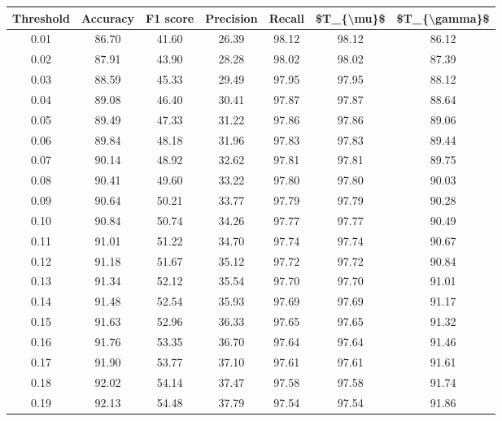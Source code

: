 \begin{tabular}{|c|c|c|c|c|c|c|}
\hline
 Threshold &  Accuracy &  F1 score &  Precision &  Recall &  \$T\_\{\textbackslash mu\}\$ &  \$T\_\{\textbackslash gamma\}\$ \\
\hline
      0.01 &     86.70 &     41.60 &      26.39 &   98.12 &      98.12 &         86.12 \\
      0.02 &     87.91 &     43.90 &      28.28 &   98.02 &      98.02 &         87.39 \\
      0.03 &     88.59 &     45.33 &      29.49 &   97.95 &      97.95 &         88.12 \\
      0.04 &     89.08 &     46.40 &      30.41 &   97.87 &      97.87 &         88.64 \\
      0.05 &     89.49 &     47.33 &      31.22 &   97.86 &      97.86 &         89.06 \\
      0.06 &     89.84 &     48.18 &      31.96 &   97.83 &      97.83 &         89.44 \\
      0.07 &     90.14 &     48.92 &      32.62 &   97.81 &      97.81 &         89.75 \\
      0.08 &     90.41 &     49.60 &      33.22 &   97.80 &      97.80 &         90.03 \\
      0.09 &     90.64 &     50.21 &      33.77 &   97.79 &      97.79 &         90.28 \\
      0.10 &     90.84 &     50.74 &      34.26 &   97.77 &      97.77 &         90.49 \\
      0.11 &     91.01 &     51.22 &      34.70 &   97.74 &      97.74 &         90.67 \\
      0.12 &     91.18 &     51.67 &      35.12 &   97.72 &      97.72 &         90.84 \\
      0.13 &     91.34 &     52.12 &      35.54 &   97.70 &      97.70 &         91.01 \\
      0.14 &     91.48 &     52.54 &      35.93 &   97.69 &      97.69 &         91.17 \\
      0.15 &     91.63 &     52.96 &      36.33 &   97.65 &      97.65 &         91.32 \\
      0.16 &     91.76 &     53.35 &      36.70 &   97.64 &      97.64 &         91.46 \\
      0.17 &     91.90 &     53.77 &      37.10 &   97.61 &      97.61 &         91.61 \\
      0.18 &     92.02 &     54.14 &      37.47 &   97.58 &      97.58 &         91.74 \\
      0.19 &     92.13 &     54.48 &      37.79 &   97.54 &      97.54 &         91.86 \\

\end{tabular}
